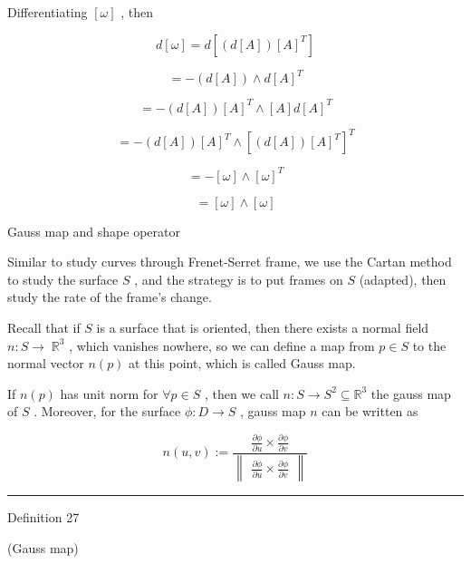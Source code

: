 \documentclass[lang=cn,a4paper,11pt,openany,twoside]{elegantbook}
\newcommand{\HRule}{\begin{center}\rule{0.9\linewidth}{0.2mm}\end{center}}
\begin{document}
Differentiating \(\left\lbrack  \omega \right\rbrack\) , then

\[
d\left\lbrack  \omega \right\rbrack   = d\left\lbrack  {\left( {d\left\lbrack  A\right\rbrack  }\right) {\left\lbrack  A\right\rbrack  }^{T}}\right\rbrack
\]

\[
=  - \left( {d\left\lbrack  A\right\rbrack  }\right)  \land  d{\left\lbrack  A\right\rbrack  }^{T}
\]

\[
=  - \left( {d\left\lbrack  A\right\rbrack  }\right) {\left\lbrack  A\right\rbrack  }^{T} \land  \left\lbrack  A\right\rbrack  d{\left\lbrack  A\right\rbrack  }^{T}
\]

\[
=  - \left( {d\left\lbrack  A\right\rbrack  }\right) {\left\lbrack  A\right\rbrack  }^{T} \land  {\left\lbrack  \left( d\left\lbrack  A\right\rbrack  \right) {\left\lbrack  A\right\rbrack  }^{T}\right\rbrack  }^{T}
\]

\[
=  - \left\lbrack  \omega \right\rbrack   \land  {\left\lbrack  \omega \right\rbrack  }^{T}
\]

\[
= \left\lbrack  \omega \right\rbrack   \land  \left\lbrack  \omega \right\rbrack
\]

Gauss map and shape operator

Similar to study curves through Frenet-Serret frame, we use the Cartan method to study the surface \(S\) , and the strategy is to put frames on \(S\) (adapted), then study the rate of the frame's change.

Recall that if \(S\) is a surface that is oriented, then there exists a normal field \(n : S \rightarrow \; {\mathbb{R}}^{3}\) , which vanishes nowhere, so we can define a map from \(p \in  S\) to the normal vector \(n\left( p\right)\) at this point, which is called Gauss map.

If \(n\left( p\right)\) has unit norm for \(\forall p \in  S\) , then we call \(n : S \rightarrow  {S}^{2} \subseteq  {\mathbb{R}}^{3}\) the gauss map of \(S\) . Moreover, for the surface \(\phi  : D \rightarrow  S\) , gauss map \(n\) can be written as

\[
n\left( {u,v}\right)  \mathrel{\text{ := }} \frac{\frac{\partial \phi }{\partial u} \times  \frac{\partial \phi }{\partial v}}{\begin{Vmatrix}\frac{\partial \phi }{\partial u} \times  \frac{\partial \phi }{\partial v}\end{Vmatrix}}
\]

\HRule

Definition 27

(Gauss map)
\end{document}

